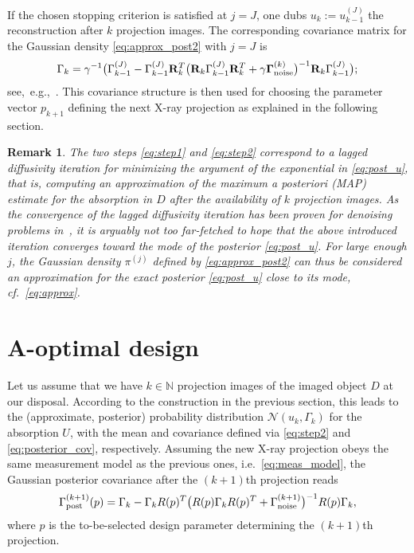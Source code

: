 \documentclass[final]{siamltex}
\newcommand{\N}{\mathbb{N}}
\newtheorem{remark}[theorem]{Remark}
\begin{document}
If the chosen stopping criterion is satisfied at $j=J$, one dubs $u_k := u_{k-1}^{(J)}$ the reconstruction after $k$ projection images. The corresponding covariance matrix for the Gaussian density \eqref{eq:approx_post2} with $j=J$ is
\begin{equation}
    \label{eq:posterior_cov}
  \Gamma_{k} = \gamma^{-1} \big( \Gamma_{k-1}^{(J)} - \Gamma_{k-1}^{(J)} \mathbf{R}_k^T \big(\mathbf{R}_k \Gamma_{k-1}^{(J)} \mathbf{R}_k^T + \gamma \bm{\Gamma}_{\rm noise}^{(k)}  \big)^{-1} \mathbf{R}_k \Gamma_{k-1}^{(J)} \big);
\end{equation}
see,~e.g.,~\cite{Kaipio06}. This covariance structure is then used for choosing the parameter vector $p_{k+1}$ defining the next X-ray projection as explained in the following section.

\begin{remark}
  The two steps \eqref{eq:step1} and \eqref{eq:step2} correspond to a lagged diffusivity iteration for minimizing the argument of the exponential in \eqref{eq:post_u}, that is, computing an approximation of the {\em maximum a posteriori} (MAP) estimate for the absorption in $D$ after the availability of $k$  projection images. As the convergence of the lagged diffusivity iteration has been proven for denoising problems in~\cite{dobson1997convergence,chan1999convergence}, it is arguably not too far-fetched to hope that the above introduced iteration converges toward the mode of the posterior \eqref{eq:post_u}. For large enough $j$, the Gaussian density $\pi^{(j)}$ defined by \eqref{eq:approx_post2} can thus be considered an approximation for the exact posterior \eqref{eq:post_u} close to its mode, cf.~\eqref{eq:approx}.
\end{remark}


\section{A-optimal design}
\label{sec:A_optimality}

Let us assume that we have $k \in \N$ projection images of the imaged object $D$ at our disposal. According to the construction in the previous section, this leads to the (approximate, posterior) probability
distribution $\mathcal{N}(u_{k}, \Gamma_{k})$ for the absorption $U$, with the mean and covariance defined via \eqref{eq:step2} and \eqref{eq:posterior_cov}, respectively.
Assuming the new X-ray projection obeys the same measurement model as the previous ones, i.e.~\eqref{eq:meas_model}, the Gaussian posterior covariance after the $(k+1)$th projection reads
\begin{equation}
  \label{eq:p_postcov}
 \Gamma_{\rm post}^{(k+1)}(p) = \Gamma_{k} - \Gamma_{k} R(p)^T \big(R(p) \Gamma_{k} R(p)^T + \Gamma_{\rm noise}^{(k+1)}  \big)^{-1} R(p) \Gamma_{k},
\end{equation}
where $p$ is the to-be-selected design parameter determining the $(k+1)$th projection.
\end{document}

